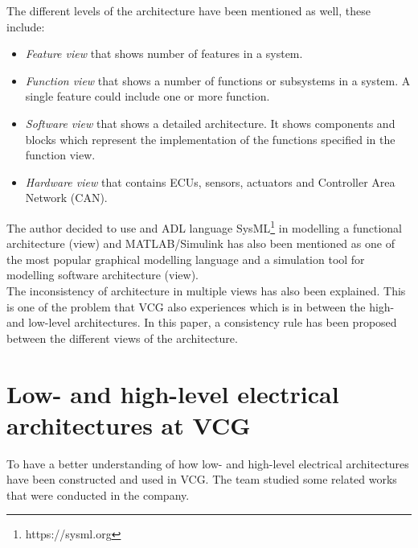 The different levels of the architecture have been mentioned as well, these include:
\begin{itemize}
    \item \textit{Feature view} that shows number of features in a system.
    \item \textit{Function view} that shows a number of functions or subsystems in a system. A single feature could include one or more function.
    \item \textit{Software view} that shows a detailed architecture. It shows components and blocks which represent the implementation of the functions specified in the function view.
    \item \textit{Hardware view} that contains ECUs, sensors, actuators and Controller Area Network (CAN).
\end{itemize}
\vspace{0.2cm}
The author decided to use and ADL language SysML\footnote{https://sysml.org} in modelling a functional architecture (view) and MATLAB/Simulink has also been mentioned as one of the most popular graphical modelling language and a simulation tool for modelling software architecture (view). \\

The inconsistency of architecture in multiple views has also been explained. This is one of the problem that VCG also experiences which is in between the high- and low-level architectures. In this paper, a consistency rule has been proposed between the different views of the architecture.\\



\section{Low- and high-level electrical architectures at VCG}
To have a better understanding of how low- and high-level electrical architectures have been constructed and used in VCG. The team studied some related works that were conducted in the company.\\

